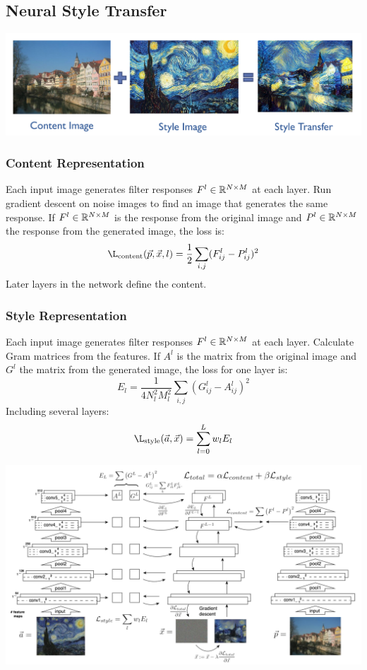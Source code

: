 \subsection{Neural Style Transfer}
\begin{center}
	\includegraphics[width=0.7\linewidth]{img/conditional_GAN_style_transfer}
\end{center}

\subsubsection{Content Representation}
Each input image generates filter responses $F^l \in \mathbb{R}^{N\times M}$ at each layer.
Run gradient descent on noise images to find an image that generates the same response.
If $F^l \in \mathbb{R}^{N\times M}$ is the response from the original image and $P^l \in \mathbb{R}^{N\times M}$ the response from the generated image,
the loss is:
\begin{equation*}
	\L_{\text{content}}(\vec{p},\vec{x},l) = \frac{1}{2} \sum_{i,j} (F_{ij}^l - P_{ij}^l)^2
\end{equation*}
Later layers in the network define the content.

\subsubsection{Style Representation}
Each input image generates filter responses $F^l \in \mathbb{R}^{N\times M}$ at each layer. Calculate Gram matrices from the features.
If $A^l$ is the matrix from the original image and $G^l$ the matrix from the generated image, the loss for one layer is:
\begin{equation*}
	E_l = \frac{1}{4 N_l^2 M_l^2}\sum_{i,j}(G_{ij}^l - A_{ij}^l)^2
\end{equation*}
Including several layers:
\begin{equation*}
	\L_{\text{style}}(\vec{a},\vec{x}) = \sum_{l=0}^{L}w_l E_l
\end{equation*}

\begin{center}
	\includegraphics[width=0.8\linewidth]{img/conditional_GAN_style_representation.png}
\end{center}

